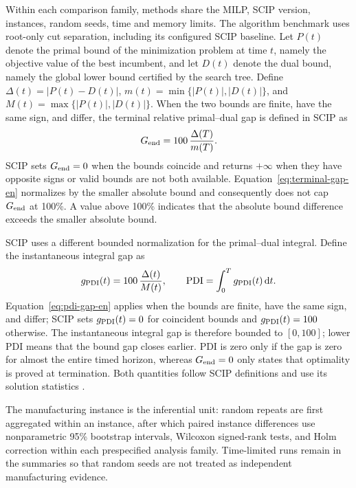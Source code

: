 \documentclass[journal]{IEEEtran}
\newcommand{\pdi}{\mathrm{PDI}}
\newcounter{algorithm}
\begin{document}
Within each comparison family, methods share the MILP, SCIP version, instances, random seeds, time and memory limits. The algorithm benchmark uses root-only cut separation, including its configured SCIP baseline. Let $P(t)$ denote the primal bound of the minimization problem at time $t$, namely the objective value of the best incumbent, and let $D(t)$ denote the dual bound, namely the global lower bound certified by the search tree. Define $\Delta(t)=|P(t)-D(t)|$, $m(t)=\min\{|P(t)|,|D(t)|\}$, and $M(t)=\max\{|P(t)|,|D(t)|\}$. When the two bounds are finite, have the same sign, and differ, the terminal relative primal--dual gap is defined in SCIP as
\begin{equation}
G_{\rm end}=100\,\frac{\Delta(T)}{m(T)}.
\label{eq:terminal-gap-en}
\end{equation}
SCIP sets $G_{\rm end}=0$ when the bounds coincide and returns $+\infty$ when they have opposite signs or valid bounds are not both available. Equation~\eqref{eq:terminal-gap-en} normalizes by the smaller absolute bound and consequently does not cap $G_{\rm end}$ at 100\%. A value above 100\% indicates that the absolute bound difference exceeds the smaller absolute bound.

SCIP uses a different bounded normalization for the primal--dual integral. Define the instantaneous integral gap as
\begin{equation}
g_{\rm PDI}(t)=100\,\frac{\Delta(t)}{M(t)},\qquad
\pdi=\int_0^T g_{\rm PDI}(t)\,\mathrm dt.
\label{eq:pdi-gap-en}
\end{equation}
Equation~\eqref{eq:pdi-gap-en} applies when the bounds are finite, have the same sign, and differ; SCIP sets $g_{\rm PDI}(t)=0$ for coincident bounds and $g_{\rm PDI}(t)=100$ otherwise. The instantaneous integral gap is therefore bounded to $[0,100]$; lower PDI means that the bound gap closes earlier. PDI is zero only if the gap is zero for almost the entire timed horizon, whereas $G_{\rm end}=0$ only states that optimality is proved at termination. Both quantities follow SCIP definitions and use its solution statistics \cite{achterberg2009scip,bestuzheva2023scip}.

The manufacturing instance is the inferential unit: random repeats are first aggregated within an instance, after which paired instance differences use nonparametric 95\% bootstrap intervals, Wilcoxon signed-rank tests, and Holm correction within each prespecified analysis family. Time-limited runs remain in the summaries so that random seeds are not treated as independent manufacturing evidence. 
\end{document}
